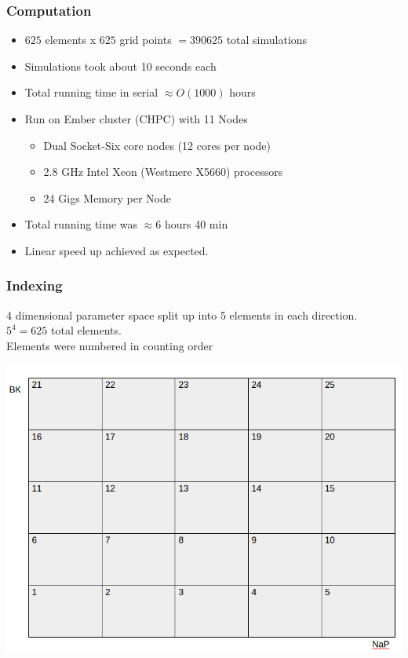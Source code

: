 \documentclass{beamer}
\theoremstyle{plain}
\theoremstyle{definition}
\begin{document}
\begin{frame}\frametitle{Computation}
  \begin{itemize}
    \item $625$ elements x $625$ grid points $= 390625$ total simulations
    \item Simulations took about 10 seconds each
    \item Total running time in serial $\approx O(1000)$ hours
    \item Run on Ember cluster (CHPC) with 11 Nodes
    \begin{itemize}
      \item Dual Socket-Six core nodes (12 cores per node)
      \item 2.8 GHz Intel Xeon (Westmere X5660) processors
      \item 24 Gigs Memory per Node
    \end{itemize}
    \item Total running time was $\approx 6$ hours 40 min
    \item Linear speed up achieved as expected.
  \end{itemize}
\end{frame}

\begin{frame}\frametitle{Indexing}
  4 dimensional parameter space split up into 5 elements in each direction. $5^4 = 625$ total elements.\\
  \vspace{1em}
  Elements were numbered in counting order

  \begin{center}
    \includegraphics[scale=.25]{indexing.png}%
  \end{center}
\end{frame}
\end{document}
